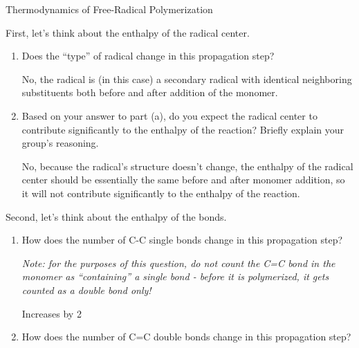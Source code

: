 \begin{activity}{Thermodynamics of Free-Radical Polymerization}
\begin{model}
\end{model}


\begin{ctqs}

	\question First, let's think about the enthalpy of the radical center. \label{\labelbase:ctq:radicalenthalpy}
	
		\begin{enumerate}
		
			\item Does the ``type'' of radical change in this propagation step?
				
				\begin{solution}[0.5in]{}
					No, the radical is (in this case) a secondary radical with identical neighboring substituents both before and after addition of the monomer.
				\end{solution}
			
			\item Based on your answer to part (a), do you expect the radical center to contribute significantly to the enthalpy of the reaction?  Briefly explain your group's reasoning.
				
				\begin{solution}[1in]{}
					No, because the radical's structure doesn't change, the enthalpy of the radical center should be essentially the same before and after monomer addition, so it will not contribute significantly to the enthalpy of the reaction.
				\end{solution}
			
		\end{enumerate}
		
	\question Second, let's think about the enthalpy of the bonds. \label{\labelbase:ctq:bondenthalpy}
	
		\begin{enumerate}
			\item How does the number of C-C single bonds change in this propagation step?
			
				\emph{Note: for the purposes of this question, do not count the C=C bond in the monomer as ``containing'' a single bond - before it is polymerized, it gets counted as a double bond only!}
				
				\begin{solution}[1in]{}
					Increases by 2
				\end{solution}
			
			\item How does the number of C=C double bonds change in this propagation step?
				

\end{enumerate}
\end{ctqs}
\end{activity}
